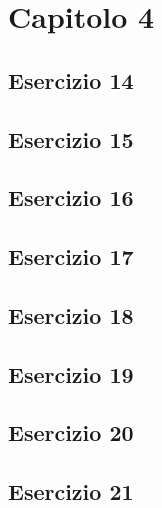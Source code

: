 \section{\textbf{Capitolo 4}}
\subsection{Esercizio 14}

\newpage
\subsection{Esercizio 15}

\newpage
\subsection{Esercizio 16}

\newpage
\subsection{Esercizio 17}

\newpage
\subsection{Esercizio 18}

\newpage
\subsection{Esercizio 19}

\newpage
\subsection{Esercizio 20}

\newpage
\subsection{Esercizio 21}

\newpage
